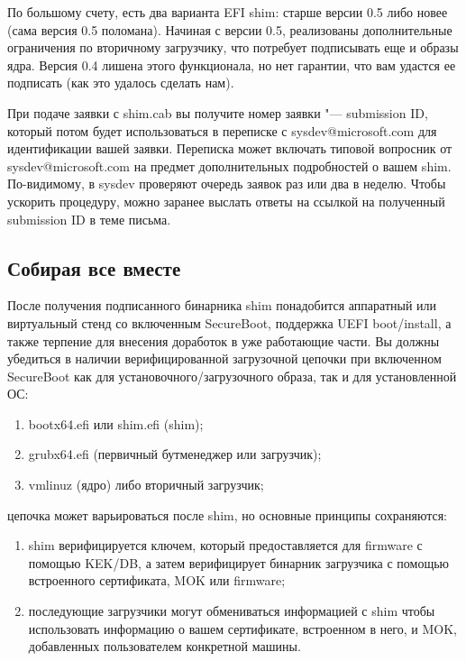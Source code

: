 \documentclass[10pt, a5paper]{article}
\begin{document}
По большому счету, есть два варианта EFI shim: старше версии 0.5 либо новее (сама версия 0.5 поломана). Начиная с версии 0.5, реализованы дополнительные ограничения по вторичному загрузчику, что потребует подписывать еще и образы ядра. Версия 0.4 лишена этого функционала, но нет гарантии, что вам удастся ее подписать (как это удалось сделать нам).

При подаче заявки с shim.cab вы получите номер заявки "--- submission ID, который потом будет использоваться в переписке с sysdev@microsoft.com для идентификации вашей заявки. Переписка может включать типовой вопросник от sysdev@microsoft.com на предмет дополнительных подробностей о вашем shim. По-видимому, в sysdev проверяют очередь заявок раз или два в неделю. Чтобы ускорить процедуру, можно заранее выслать ответы на ссылкой на полученный submission ID в теме письма.

\subsection*{Собирая все вместе}

После получения подписанного бинарника shim понадобится аппаратный или виртуальный стенд со включенным SecureBoot, поддержка UEFI boot/install, а также терпение для внесения доработок в уже работающие части.
Вы должны убедиться в наличии верифицированной загрузочной цепочки при включенном SecureBoot как для установочного/загрузочного образа, так и для установленной ОС:

\begin{enumerate}
  \item bootx64.efi или shim.efi (shim);
  \item grubx64.efi (первичный бутменеджер или загрузчик);
  \item vmlinuz (ядро) либо вторичный загрузчик;
\end{enumerate}

цепочка может варьироваться после shim, но основные принципы сохраняются:

\begin{enumerate}
  \item shim верифицируется ключем, который предоставляется для firmware с помощью KEK/DB, а затем верифицирует бинарник загрузчика с помощью встроенного сертификата, MOK или firmware;
  \item последующие загрузчики могут обмениваться информацией с shim чтобы использовать информацию о вашем сертификате, встроенном в него, и MOK, добавленных пользователем конкретной машины.
\end{enumerate}
\end{document}
